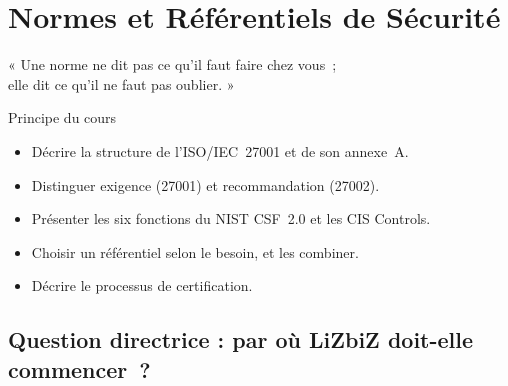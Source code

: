 
\chapter{Normes et Référentiels de Sécurité}
\label{chap:normes}

\epigraph{%
    « Une norme ne dit pas ce qu'il faut faire chez vous~;\\
    elle dit ce qu'il ne faut pas oublier. »%
}{Principe du cours}


\begin{boxobjectifs}
\begin{itemize}
    \item Décrire la structure de l'ISO/IEC~27001 et de son annexe~A.
    \item Distinguer exigence (27001) et recommandation (27002).
    \item Présenter les six fonctions du NIST CSF~2.0 et les CIS Controls.
    \item Choisir un référentiel selon le besoin, et les combiner.
    \item Décrire le processus de certification.
\end{itemize}
\end{boxobjectifs}

\bigskip

\section*{Question directrice : par où LiZbiZ doit-elle commencer~?}

